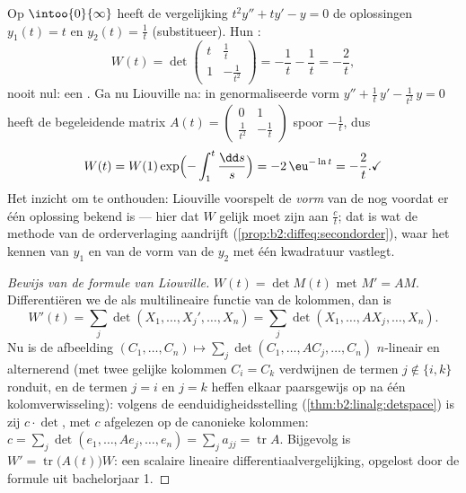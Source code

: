\begin{example}\label{ex:b2:diffeq:eulerwronskian}
Op $\intoo{0}{\infty}$ heeft de vergelijking $t^2y'' + ty' - y = 0$
de oplossingen $y_1(t) = t$ en $y_2(t) = \frac1t$ (substitueer).
Hun :
\[
W(t) = \det\begin{pmatrix} t & \tfrac1t\\[2pt]
1 & -\tfrac{1}{t^2}\end{pmatrix}
= -\frac1t - \frac1t = -\frac2t ,
\]
nooit nul: een . Ga nu Liouville na: in
genormaliseerde vorm $y'' + \frac1t\,y' - \frac{1}{t^2}\,y = 0$
heeft de begeleidende matrix $A(t) = \begin{pmatrix} 0 & 1\\
\frac{1}{t^2} & -\frac1t\end{pmatrix}$ spoor $-\frac1t$, dus
\[
W(t) = W(1)\exp\Bigl(-\int_1^t\frac{\dd s}{s}\Bigr)
= -2\,\eu^{-\ln t} = -\frac2t . \checkmark
\]
Het inzicht om te onthouden: Liouville voorspelt de \emph{vorm} van
de  nog voordat er één oplossing bekend is --- hier dat
$W$ gelijk moet zijn aan $\frac{c}{t}$; dat is wat de methode van
de orderverlaging aandrijft (\cref{prop:b2:diffeq:secondorder}),
waar het kennen van $y_1$ en van de vorm van de  $y_2$
met één kwadratuur vastlegt.
\end{example}

\begin{proof}[Bewijs van de formule van Liouville]
$W(t) = \det M(t)$ met $M' = AM$. Differentiëren we de 
als multilineaire functie van de kolommen, dan is
\[
W'(t) = \sum_j \det(X_1, \dots, X_j', \dots, X_n)
= \sum_j \det(X_1, \dots, AX_j, \dots, X_n) .
\]
Nu is de afbeelding $(C_1, \dots, C_n) \mapsto \sum_j \det(C_1,
\dots, AC_j, \dots, C_n)$ $n$-lineair en alternerend (met twee
gelijke kolommen $C_i = C_k$ verdwijnen de termen $j \notin \{i,
k\}$ ronduit, en de termen $j = i$ en $j = k$ heffen elkaar
paarsgewijs op na één kolomverwisseling): volgens de
eenduidigheidsstelling (\cref{thm:b2:linalg:detspace}) is zij $c
\cdot \det$, met $c$ afgelezen op de canonieke kolommen: $c =
\sum_j \det(e_1, \dots, Ae_j, \dots, e_n) = \sum_j a_{jj} =
\operatorname{tr} A$. Bijgevolg is $W' =
\operatorname{tr}\bigl(A(t)\bigr)W$: een scalaire lineaire
differentiaalvergelijking, opgelost door de formule uit
bachelorjaar 1.
\end{proof}

